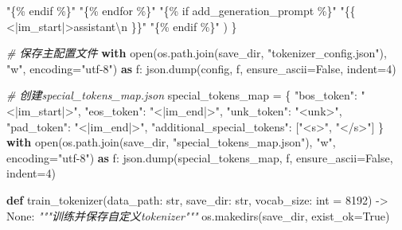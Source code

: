 \documentclass[
]{article}
\newenvironment{Shaded}{}{}
\newcommand{\BuiltInTok}[1]{\textcolor[rgb]{0.00,0.50,0.00}{#1}}
\newcommand{\CharTok}[1]{\textcolor[rgb]{0.25,0.44,0.63}{#1}}
\newcommand{\CommentTok}[1]{\textcolor[rgb]{0.38,0.63,0.69}{\textit{#1}}}
\newcommand{\ControlFlowTok}[1]{\textcolor[rgb]{0.00,0.44,0.13}{\textbf{#1}}}
\newcommand{\DecValTok}[1]{\textcolor[rgb]{0.25,0.63,0.44}{#1}}
\newcommand{\ImportTok}[1]{\textcolor[rgb]{0.00,0.50,0.00}{\textbf{#1}}}
\newcommand{\KeywordTok}[1]{\textcolor[rgb]{0.00,0.44,0.13}{\textbf{#1}}}
\newcommand{\NormalTok}[1]{#1}
\newcommand{\OperatorTok}[1]{\textcolor[rgb]{0.40,0.40,0.40}{#1}}
\newcommand{\SpecialCharTok}[1]{\textcolor[rgb]{0.25,0.44,0.63}{#1}}
\newcommand{\StringTok}[1]{\textcolor[rgb]{0.25,0.44,0.63}{#1}}
\newcommand{\VariableTok}[1]{\textcolor[rgb]{0.10,0.09,0.49}{#1}}
\begin{document}
\begin{Shaded}
\begin{Highlighting}[]
            \StringTok{"\{}\SpecialCharTok{\% e}\StringTok{ndif \%\}"}
            \StringTok{"\{}\SpecialCharTok{\% e}\StringTok{ndfor \%\}"}
            \StringTok{"\{}\SpecialCharTok{\% i}\StringTok{f add\_generation\_prompt \%\}"}
            \StringTok{"}\SpecialCharTok{\{\{}\StringTok{ \textquotesingle{}\textless{}|im\_start|\textgreater{}assistant}\CharTok{\textbackslash{}n}\StringTok{\textquotesingle{} }\SpecialCharTok{\}\}}\StringTok{"}
            \StringTok{"\{}\SpecialCharTok{\% e}\StringTok{ndif \%\}"}
\NormalTok{        )}
\NormalTok{    \}}

    \CommentTok{\# 保存主配置文件}
    \ControlFlowTok{with} \BuiltInTok{open}\NormalTok{(os.path.join(save\_dir, }\StringTok{"tokenizer\_config.json"}\NormalTok{), }\StringTok{"w"}\NormalTok{, encoding}\OperatorTok{=}\StringTok{"utf{-}8"}\NormalTok{) }\ImportTok{as}\NormalTok{ f:}
\NormalTok{        json.dump(config, f, ensure\_ascii}\OperatorTok{=}\VariableTok{False}\NormalTok{, indent}\OperatorTok{=}\DecValTok{4}\NormalTok{)}

    \CommentTok{\# 创建special\_tokens\_map.json}
\NormalTok{    special\_tokens\_map }\OperatorTok{=}\NormalTok{ \{}
        \StringTok{"bos\_token"}\NormalTok{: }\StringTok{"\textless{}|im\_start|\textgreater{}"}\NormalTok{,}
        \StringTok{"eos\_token"}\NormalTok{: }\StringTok{"\textless{}|im\_end|\textgreater{}"}\NormalTok{,}
        \StringTok{"unk\_token"}\NormalTok{: }\StringTok{"\textless{}unk\textgreater{}"}\NormalTok{,}
        \StringTok{"pad\_token"}\NormalTok{: }\StringTok{"\textless{}|im\_end|\textgreater{}"}\NormalTok{,}
        \StringTok{"additional\_special\_tokens"}\NormalTok{: [}\StringTok{"\textless{}s\textgreater{}"}\NormalTok{, }\StringTok{"\textless{}/s\textgreater{}"}\NormalTok{]}
\NormalTok{    \}}
    \ControlFlowTok{with} \BuiltInTok{open}\NormalTok{(os.path.join(save\_dir, }\StringTok{"special\_tokens\_map.json"}\NormalTok{), }\StringTok{"w"}\NormalTok{, encoding}\OperatorTok{=}\StringTok{"utf{-}8"}\NormalTok{) }\ImportTok{as}\NormalTok{ f:}
\NormalTok{        json.dump(special\_tokens\_map, f, ensure\_ascii}\OperatorTok{=}\VariableTok{False}\NormalTok{, indent}\OperatorTok{=}\DecValTok{4}\NormalTok{)}

\KeywordTok{def}\NormalTok{ train\_tokenizer(data\_path: }\BuiltInTok{str}\NormalTok{, save\_dir: }\BuiltInTok{str}\NormalTok{, vocab\_size: }\BuiltInTok{int} \OperatorTok{=} \DecValTok{8192}\NormalTok{) }\OperatorTok{{-}\textgreater{}} \VariableTok{None}\NormalTok{:}
    \CommentTok{"""训练并保存自定义tokenizer"""}
\NormalTok{    os.makedirs(save\_dir, exist\_ok}\OperatorTok{=}\VariableTok{True}\NormalTok{)}
    

\end{Highlighting}
\end{Shaded}
\end{document}
